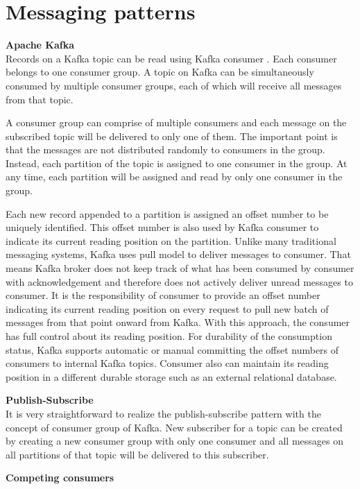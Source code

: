\section{Messaging patterns} \label{section:patterns}
\large \textbf{Apache Kafka}\\
\normalsize
Records on a Kafka topic can be read using Kafka consumer \cite{kafkadesignconsumer}.  Each consumer belongs to one consumer group. A topic on Kafka can be simultaneously consumed by multiple consumer groups, each of which will receive all messages from that topic. 
 
A consumer group can comprise of multiple consumers and each message on the subscribed topic will be delivered to only one of them. The important point is that the messages are not distributed randomly to consumers in the group. Instead, each partition of the topic is assigned to one consumer in the group. At any time, each partition will be assigned and read by only one consumer in the group. 

Each new record appended to a partition is assigned an offset number to be uniquely identified. This offset number is also used by Kafka consumer to indicate its current reading position on the partition. Unlike many traditional messaging systems, Kafka uses pull model to deliver messages to consumer. That means Kafka broker does not keep track of what has been consumed by consumer with acknowledgement and therefore does not actively deliver unread messages to consumer.  It is the responsibility of consumer to provide an offset number indicating its current reading position on every request to pull new batch of messages from that point onward from Kafka. With this approach, the consumer has full control about its reading position. For durability of the consumption status, Kafka supports automatic or manual committing the offset numbers of consumers to internal Kafka topics. Consumer also can maintain its reading position in a different durable storage such as an external relational database.

\textbf{Publish-Subscribe}\\
It is very straightforward to realize the publish-subscribe pattern with the concept of consumer group of Kafka. New subscriber for a topic can be created by creating a new consumer group with only one consumer and all messages on all partitions of that topic will be delivered to this subscriber.

\textbf{Competing consumers}\\


